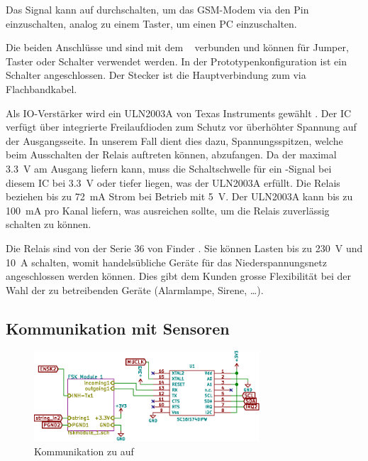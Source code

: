 Das Signal  kann auf  durchschalten, um das GSM-Modem
via den Pin   einzuschalten, analog zu einem  Taster, um einen
PC einzuschalten.

Die  beiden  Anschl\"usse    und   sind  mit  dem  \Raspi~
verbunden und k\"onnen f\"ur Jumper, Taster oder Schalter verwendet werden. In
der  Prototypenkonfiguration  ist   ein  Schalter  angeschlossen. Der  Stecker
 ist die Hauptverbindung zum \Raspi via Flachbandkabel.

Als  IO-Verst\"arker  wird  ein   ULN2003A  von  Texas  Instruments  gew\"ahlt
\cite{datasheet:darlingtonic}. Der    IC    verf\"ugt    \"uber    integrierte
Freilaufdioden   zum    Schutz   vor    \"uberh\"ohter   Spannung    auf   der
Ausgangsseite. In unserem Fall dient  dies dazu, Spannungsspitzen, welche beim
Ausschalten der Relais auftreten k\"onnen,  abzufangen.  Da der \Raspi maximal
\SI{3.3}{\volt} am  Ausgang liefern  kann, muss  die Schaltschwelle  f\"ur ein
-Signal bei diesem  IC bei \SI{3.3}{\volt} oder  tiefer liegen, was
der  ULN2003A erf\"ullt.   Die Relais  beziehen bis  zu \SI{72}{\milli\ampere}
\cite{datasheet:finder36relais}  Strom  bei   Betrieb  mit  \SI{5}{\volt}. Der
ULN2003A kann bis zu \SI{100}{\milli\ampere} pro Kanal liefern, was ausreichen
sollte, um die Relais zuverl\"assig schalten zu k\"onnen.

Die     Relais      sind     von      der     Serie     36      von     Finder
\cite{datasheet:finder36relais}. Sie  k\"onnen Lasten  bis zu  \SI{230}{\volt}
und  \SI{10}{\ampere}  schalten,  womit handels\"ubliche  Ger\"ate  f\"ur  das
Niederspannungsnetz angeschlossen werden k\"onnen. Dies gibt dem Kunden grosse
Flexibilit\"at bei der Wahl der  zu betreibenden Ger\"ate (Alarmlampe, Sirene,
\ldots).


\subsection{Kommunikation mit Sensoren}
\label{subsec:hw:master:sensorcomm}


\begin{figure}[h!t]
    \centering
    \includegraphics[width=0.75\textwidth]{images/superv-sch/supervisor--sch--comms.eps}
    \caption[\Master: Schema Kommunikation]{Kommunikation zu \Sensor auf \Master}
    \label{fig:sch:master:comms}
\end{figure}

